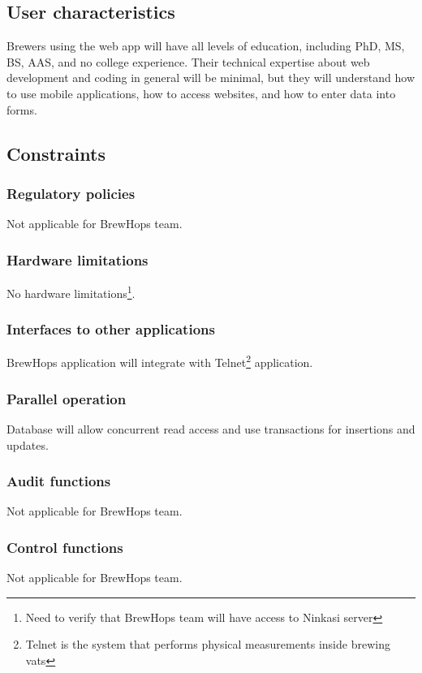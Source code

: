 \documentclass[draftclsnofoot,onecolumn,letterpaper,10pt,compsoc]{IEEEtran}
\begin{document}
	\subsection{User characteristics}
    Brewers using the web app will have all levels of education, including PhD, MS, BS, AAS, and no college experience. Their technical expertise about web development and coding in general will be minimal, but they will understand how to use mobile applications, how to access websites, and how to enter data into forms.
    
	\subsection{Constraints}
		\subsubsection{Regulatory policies}
        Not applicable for BrewHops team.
        
		\subsubsection{Hardware limitations}
        No hardware limitations\footnote{Need to verify that BrewHops team will have access to Ninkasi server}.
        
		\subsubsection{Interfaces to other applications}
        BrewHops application will integrate with Telnet\footnote{Telnet is the system that performs physical measurements inside brewing vats} application.
        
		\subsubsection{Parallel operation}
        Database will allow concurrent read access and use transactions for insertions and updates.
        
		\subsubsection{Audit functions}
        Not applicable for BrewHops team.
        
		\subsubsection{Control functions}
        Not applicable for BrewHops team.
        
\end{document}

